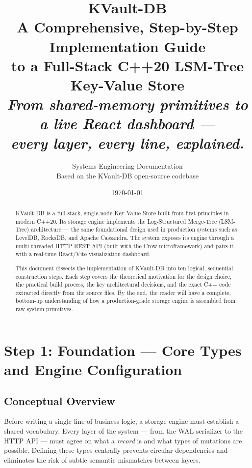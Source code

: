 \documentclass[11pt,a4paper]{article}
\title{
    \vspace{-0.5cm}
    \LARGE\textbf{KVault-DB}\\[0.4cm]
    \large A Comprehensive, Step-by-Step Implementation Guide\\
    \large to a Full-Stack C++20 LSM-Tree Key-Value Store\\[0.6cm]
    \normalsize\textit{From shared-memory primitives to a live React dashboard ---}\\
    \normalsize\textit{every layer, every line, explained.}
}
\author{
    Systems Engineering Documentation\\
    \small Based on the KVault-DB open-source codebase
}
\date{\today}
\begin{document}

\maketitle
\thispagestyle{empty}
\vspace{2cm}

\begin{abstract}
\noindent
KVault-DB is a full-stack, single-node Key-Value Store built from first
principles in modern C++20. Its storage engine implements the
Log-Structured Merge-Tree (LSM-Tree) architecture --- the same foundational
design used in production systems such as LevelDB, RocksDB, and Apache
Cassandra. The system exposes its engine through a multi-threaded HTTP REST API
(built with the Crow microframework) and pairs it with a real-time React/Vite
visualization dashboard.

This document dissects the implementation of KVault-DB into ten logical,
sequential construction steps. Each step covers the theoretical motivation
for the design choice, the practical build process, the key architectural
decisions, and the exact C++ code extracted directly from the source files.
By the end, the reader will have a complete, bottom-up understanding of
how a production-grade storage engine is assembled from raw system primitives.
\end{abstract}

\newpage
\tableofcontents
\newpage

\section{Step 1: Foundation --- Core Types and Engine Configuration}
\label{sec:types}

\subsection{Conceptual Overview}

Before writing a single line of business logic, a storage engine must
establish a shared vocabulary. Every layer of the system --- from the WAL
serializer to the HTTP API --- must agree on what a \emph{record} is and what
types of mutations are possible. Defining these types centrally prevents
circular dependencies and eliminates the risk of subtle semantic mismatches
between layers.
\end{document}
